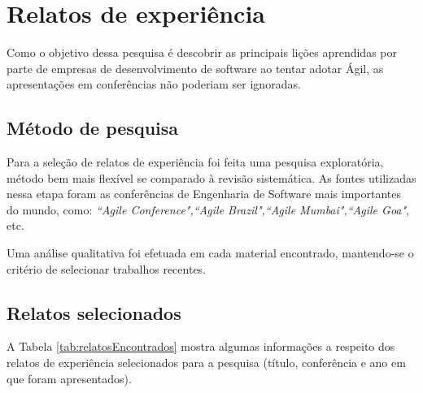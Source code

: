 %
%

\section{Relatos de experiência}

Como o objetivo dessa pesquisa é descobrir as principais lições aprendidas por parte de empresas de desenvolvimento de software ao tentar adotar Ágil, as apresentações em conferências não poderiam ser ignoradas.

\subsection{Método de pesquisa}

Para a seleção de relatos de experiência foi feita uma pesquisa exploratória, método bem mais flexível se comparado à revisão sistemática. As fontes utilizadas nessa etapa foram as conferências de Engenharia de Software mais importantes do mundo, como: \textit{``Agile Conference",``Agile Brazil",``Agile Mumbai",``Agile Goa"}, etc.

Uma análise qualitativa foi efetuada em cada material encontrado, mantendo-se o critério de selecionar trabalhos recentes.

\subsection{Relatos selecionados}

A Tabela \ref{tab:relatosEncontrados} mostra algumas informações a respeito dos relatos de experiência selecionados para a pesquisa (título, conferência e ano em que foram apresentados).

